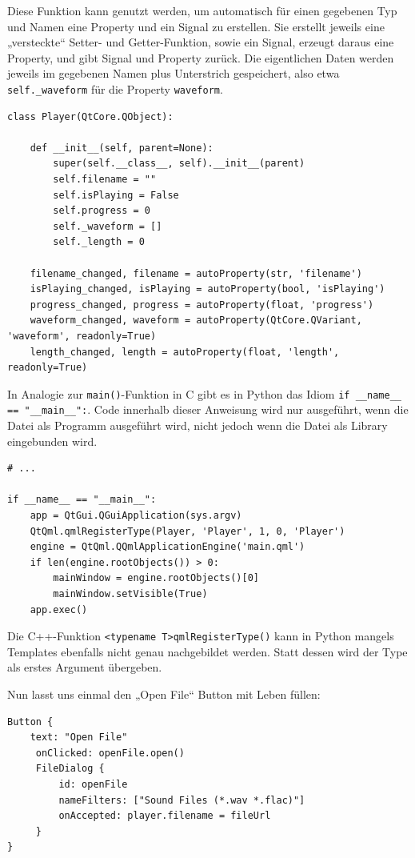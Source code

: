 \documentclass[a4paper]{article}
\begin{document}
Diese Funktion kann genutzt werden, um automatisch für einen gegebenen Typ und Namen eine Property und ein Signal zu erstellen. Sie erstellt jeweils eine „versteckte“ Setter- und Getter-Funktion, sowie ein Signal, erzeugt daraus eine Property, und gibt Signal und Property zurück. Die eigentlichen Daten werden jeweils im gegebenen Namen plus Unterstrich gespeichert, also etwa \verb~self._waveform~ für die Property \verb~waveform~.

\begin{verbatim}
class Player(QtCore.QObject):

    def __init__(self, parent=None):
        super(self.__class__, self).__init__(parent)
        self.filename = ""
        self.isPlaying = False
        self.progress = 0
        self._waveform = []
        self._length = 0

    filename_changed, filename = autoProperty(str, 'filename')
    isPlaying_changed, isPlaying = autoProperty(bool, 'isPlaying')
    progress_changed, progress = autoProperty(float, 'progress')
    waveform_changed, waveform = autoProperty(QtCore.QVariant, 'waveform', readonly=True)
    length_changed, length = autoProperty(float, 'length', readonly=True)
\end{verbatim}

In Analogie zur \verb~main()~-Funktion in C gibt es in Python das Idiom \verb~if __name__ == "__main__":~. Code innerhalb dieser Anweisung wird nur ausgeführt, wenn die Datei als Programm ausgeführt wird, nicht jedoch wenn die Datei als Library eingebunden wird.

\begin{verbatim}
# ...

if __name__ == "__main__":
    app = QtGui.QGuiApplication(sys.argv)
    QtQml.qmlRegisterType(Player, 'Player', 1, 0, 'Player')
    engine = QtQml.QQmlApplicationEngine('main.qml')
    if len(engine.rootObjects()) > 0:
        mainWindow = engine.rootObjects()[0]
        mainWindow.setVisible(True)
    app.exec()
\end{verbatim}

Die C++-Funktion \verb~<typename T>qmlRegisterType()~ kann in Python mangels Templates ebenfalls nicht genau nachgebildet werden. Statt dessen wird der Type als erstes Argument übergeben.

Nun lasst uns einmal den „Open File“ Button mit Leben füllen:

\begin{verbatim}
Button {
    text: "Open File"
     onClicked: openFile.open()
     FileDialog {
         id: openFile
         nameFilters: ["Sound Files (*.wav *.flac)"]
         onAccepted: player.filename = fileUrl
     }
}
\end{verbatim}
\end{document}
